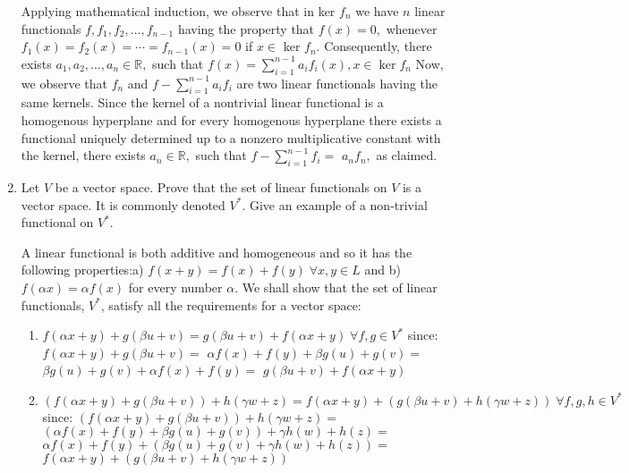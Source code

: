 \documentclass[12pt,letterpaper,reqno]{amsart}
\begin{document}
\begin{enumerate}[1.]
\begin{flushleft}
    Applying mathematical induction, we observe that in ker $f _ { n }$ we have $n$
linear functionals $f , f _ { 1 } , f _ { 2 } , \ldots , f _ { n - 1 }$ having the property that $f ( x ) = 0 ,$ whenever $f _ { 1 } ( x ) = f _ { 2 } ( x ) = \cdots = f _ { n - 1 } ( x ) = 0$ if $x \in$ ker $f _ { n } .$ Consequently, there exists $a _ { 1 } , a _ { 2 } , \ldots , a _ { n } \in \mathbb { R } ,$ such that $f ( x ) = \sum _ { i = 1 } ^ { n - 1 } a _ { i } f _ { i } ( x ) , x \in \operatorname { ker } f _ { n }$
Now, we observe that $f _ { n }$ and $f - \sum _ { i = 1 } ^ { n - 1 } a _ { i } f _ { i }$ are two linear functionals having the same kernels. Since the kernel of a nontrivial linear functional is a homogenous hyperplane and for every homogenous hyperplane there exists a functional uniquely determined up to a nonzero multiplicative constant with the kernel, there exists $a _ { n } \in \mathbb { R } ,$ such that $f - \sum _ { i = 1 } ^ { n - 1 } f _ { i } =$
$a _ { n } f _ { n } ,$ as claimed.
\end{flushleft}
\newpage
\item Let $V$ be a vector space. Prove that the set of linear functionals on $V$ is a vector space. It is commonly denoted $V^*$.  Give an example of a non-trivial functional on $V^*$.
\begin{flushleft}
A linear functional is both additive and homogeneous and so it has the following properties:\newline a) $f(x+y) = f(x) + f(y) \; \forall x, y \in L$ and b) $f(\alpha x) = \alpha f(x)$ for every number $\alpha$.
We shall show that the set of linear functionals, $V^*$, satisfy all the requirements for a vector space:
    \begin{enumerate}
        \item $f(\alpha x + y) + g(\beta u + v) = g(\beta u + v) + f(\alpha x + y) \; \forall f, g \in V^*$ since: $f(\alpha x + y) + g(\beta u + v) =$ $\alpha f(x) + f(y) + \beta g(u) + g(v) =$ $\beta g(u) + g(v) + \alpha f(x) + f(y) =$ $g(\beta u + v) + f(\alpha x + y)$
        \item $\left(f(\alpha x + y) + g(\beta u + v)\right) + h(\gamma w + z) = f(\alpha x + y) + \left(g(\beta u + v) + h(\gamma w + z)\right ) \; \forall f, g, h \in V^*$ since: $\left(f(\alpha x + y) + g(\beta u + v)\right) + h(\gamma w + z) =$ $\left(\alpha f(x) + f(y) + \beta g(u) + g(v)\right) + \gamma h(w) + h(z) =$ $\alpha f(x) + f(y) + \left(\beta g(u) + g(v) + \gamma h(w) + h(z)\right) =$ $f(\alpha x + y) + \left(g(\beta u + v) + h(\gamma w + z)\right )$

\end{enumerate}
\end{flushleft}
\end{enumerate}
\end{document}
